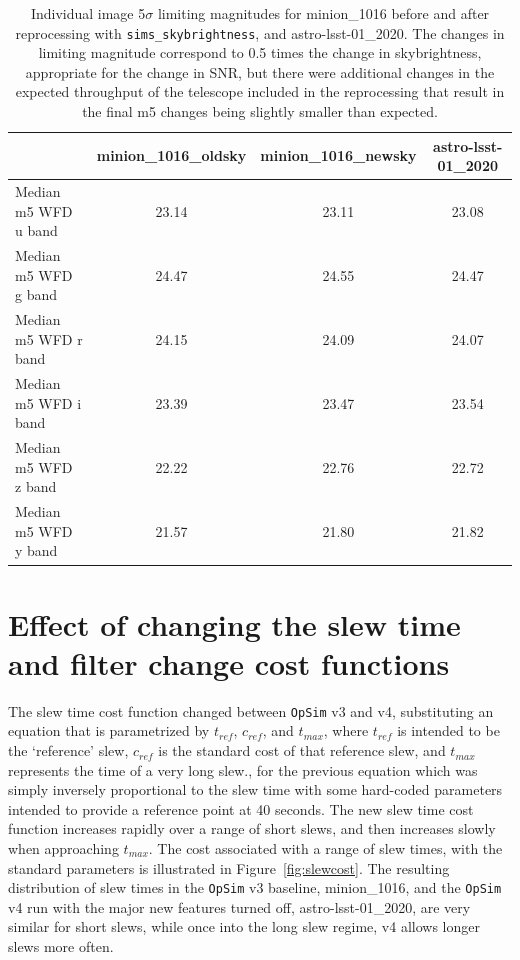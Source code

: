 \documentclass[DM,authoryear,toc]{lsstdoc}
\newcommand{\opsim}{\texttt{OpSim}\xspace}
\newcommand{\simsky}{\texttt{sims\_skybrightness}\xspace}
\begin{document}
\begin{table}[ht]
\caption{Individual image 5$\sigma$ limiting magnitudes for minion\_1016 before and after reprocessing with \simsky, and astro-lsst-01\_2020. The changes in limiting magnitude correspond to 0.5 times the change in skybrightness, appropriate for the change in SNR, but there were additional changes in the expected throughput of the telescope included in the reprocessing that result in the final m5 changes being slightly smaller than expected.}
\begin{center}
\begin{tabular}{lccc}
\toprule
{} &  minion\_1016\_oldsky &  minion\_1016\_newsky &  astro-lsst-01\_2020 \\
\midrule
Median m5 WFD u band &               23.14 &               23.11 &               23.08 \\
Median m5 WFD g band &               24.47 &               24.55 &               24.47 \\
Median m5 WFD r band &               24.15 &               24.09 &               24.07 \\
Median m5 WFD i band &               23.39 &               23.47 &               23.54 \\
Median m5 WFD z band &               22.22 &               22.76 &               22.72 \\
Median m5 WFD y band &               21.57 &               21.80 &               21.82 \\
\bottomrule
\end{tabular}
\end{center}
\label{tab:m5depth}
\end{table}

\section{Effect of changing the slew time and filter change cost functions}

The slew time cost function changed between \opsim v3 and v4, substituting an equation that is parametrized by $t_{ref}$, $c_{ref}$, and $t_{max}$, where $t_{ref}$ is intended to be the `reference' slew, $c_{ref}$ is the standard cost of that reference slew, and $t_{max}$ represents the time of a very long slew., for the previous equation which was simply inversely proportional to the slew time with some hard-coded parameters intended to provide a reference point at 40 seconds. The new slew time cost function increases rapidly over a range of short slews, and then increases slowly when approaching $t_{max}$.  The cost associated with a range of slew times, with the standard parameters is illustrated in Figure~\ref{fig:slewcost}.  The resulting distribution of slew times in the \opsim v3 baseline, minion\_1016, and the \opsim v4 run with the major new features turned off, astro-lsst-01\_2020, are very similar for short slews, while once into the long slew regime, v4 allows longer slews more often.
\end{document}
